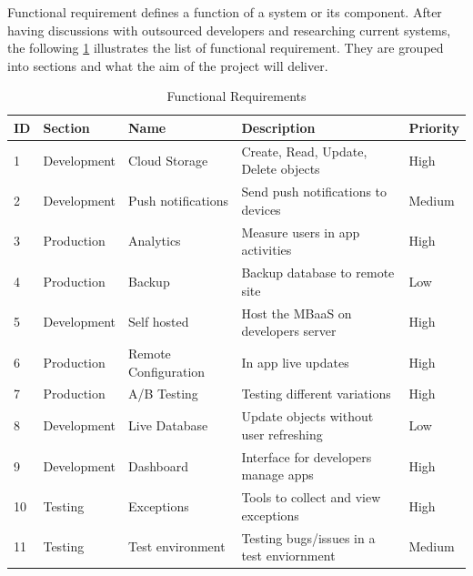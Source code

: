 Functional requirement defines a function of a system or its component. After having discussions with outsourced developers and researching current systems, the following \ref{tb:functional} illustrates the list of functional requirement. They are grouped into sections and what the aim of the project will deliver.

\begin{table}[!h]
\centering
\caption{Functional Requirements}
\label{tb:functional}
\begin{tabular}{|l|l|l|l|l|}
\hline
\cellcolor{green!20}ID & \cellcolor{green!20}Section  & \cellcolor{green!20}Name  & \cellcolor{green!20}Description        & \cellcolor{green!20}Priority \\ \hline
1                      & Development                  & Cloud Storage            & Create, Read, Update, Delete objects   & High   \\ \hline
2                      & Development                  & Push notifications        & Send push notifications to devices     & Medium \\ \hline
3                      & Production                   & Analytics                 & Measure users in app activities        & High   \\ \hline
4                      & Production                   & Backup                    & Backup database to remote site         & Low    \\ \hline
5                      & Development                  & Self hosted               & Host the MBaaS on developers server    & High   \\ \hline
6                      & Production                   & Remote Configuration      & In app live updates                    & High   \\ \hline
7                      & Production                   & A/B Testing               & Testing different variations           & High   \\ \hline
8                      & Development                  & Live Database             & Update objects without user refreshing & Low    \\ \hline
9                      & Development                  & Dashboard                & Interface for developers manage apps   & High   \\ \hline
10                     & Testing                      & Exceptions                 & Tools to collect and view exceptions   & High   \\ \hline
11                     & Testing                      & Test environment      & Testing bugs/issues in a test enviornment & Medium \\ \hline
\end{tabular}
\end{table}

